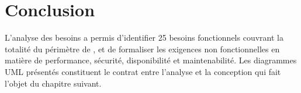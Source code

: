 \section*{Conclusion}

L'analyse des besoins a permis d'identifier 25 besoins fonctionnels couvrant
la totalité du périmètre de \caimp{}, et de formaliser les exigences non
fonctionnelles en matière de performance, sécurité, disponibilité et
maintenabilité. Les diagrammes UML présentés constituent le contrat entre
l'analyse et la conception qui fait l'objet du chapitre suivant.
